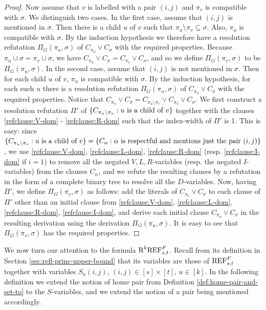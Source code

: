 \documentclass[10pt,a4paper]{article}
\theoremstyle{remark}
\newtheorem*{switching lemma}{Switching Lemma}
\newtheorem*{open problem}{Open Problem}
\theoremstyle{definition}
\begin{document}
\begin{proof}
Now assume that $v$ is labelled with a pair $(i,j)$ and $\pi_v$ is compatible with $\sigma$. We distinguish two cases. In the first case, assume that $(i,j)$ is mentioned in $\sigma$. Then there is a child $u$ of $v$ such that $\pi_u \setminus \pi_v \subseteq \sigma$. Also, $\pi_u$ is compatible with $\sigma$. By the induction hypothesis we therefore have a resolution refutation $\Pi_G(\pi_u,\sigma)$ of $C_{\pi_u} \lor C_{\sigma}$ with the required properties. Because $\pi_u \cup \sigma = \pi_v \cup \sigma$, we have $C_{\pi_u} \lor C_{\sigma} = C_{\pi_v} \lor C_{\sigma}$, and so we define $\Pi_G(\pi_v,\sigma)$ to be $\Pi_G(\pi_u,\sigma)$. In the second case, assume that $(i,j)$ is not mentioned in $\sigma$. Then for each child $u$ of $v$, $\pi_u$ is compatible with $\sigma$. By the induction hypothesis, for each such $u$ there is a resolution refutation $\Pi_G(\pi_u,\sigma)$ of $C_{\pi_u} \lor C_{\sigma}$ with the required properties. Notice that $C_{\pi_u} \lor C_{\sigma} = C_{\pi_u \setminus \pi_v} \lor C_{\pi_v} \lor C_{\sigma}$. We first construct a resolution refutation $\Pi'$ of $\{ C_{\pi_u \setminus \pi_v} : u \textnormal{ is a child of } v \}$ together with the clauses \eqref{refclause:V-dom} - \eqref{refclause:R-dom} such that the index-width of $\Pi'$ is 1. 
This is easy: since $\{ C_{\pi_u \setminus \pi_v} : u \textnormal{ is a child of } v \} = \{C_{\alpha} : \alpha \textnormal{ is respectful and mentions just the pair } (i,j) \}$, we use \eqref{refclause:V-dom}, \eqref{refclause:L-dom}, \eqref{refclause:R-dom} (resp. \eqref{refclause:I-dom} if $i=1$) to remove all the negated $V,L,R$-variables (resp. the negated $I$-variables) from the clauses $C_{\alpha}$, and we refute the resulting clauses by a refutation in the form of a complete binary tree to resolve all the $D$-variables.
Now, having $\Pi'$, we define $\Pi_G(\pi_v, \sigma)$ as follows: add the literals of $C_{\pi_v} \lor C_{\sigma}$ to each clause of $\Pi'$ other than an initial clause from \eqref{refclause:V-dom}, \eqref{refclause:L-dom}, \eqref{refclause:R-dom}, \eqref{refclause:I-dom}, and derive each initial clause $C_{\pi_u} \lor C_{\sigma}$ in the resulting derivation using the derivation $\Pi_G(\pi_u,\sigma)$. It is easy to see that $\Pi_G(\pi_v, \sigma)$ has the required properties. 
\end{proof}

We now turn our attention to the formula $\textnormal{R}^k\textnormal{REF}^{F}_{s,t}$. Recall from its definition in Section \ref{sec:refl-princ-upper-bound} that its variables are those of  $\textnormal{REF}^{F}_{s,t}$ together with variables $S_u(i,j)$, $(i,j) \in [s] \times [t]$, $u \in [k]$.
In the following definition we extend the notion of home pair from Definition \ref{def:home-pair-and-set-to} to the $S$-variables, and we extend the notion of a pair being mentioned accordingly.
\end{document}

